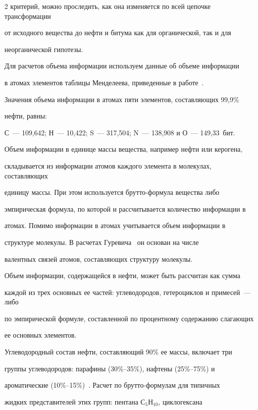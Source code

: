 \begin{multicols}{2}
критерий, можно проследить, как она изменяется по всей цепочке трансформации 

от исходного вещества до нефти и битума как для органической, так и для 

неорганической гипотезы.

     Для расчетов объема информации используем данные об объеме информации 

в атомах элементов таблицы Менделеева, приведенные в работе~\cite{8s}. 

Значения объема информации в атомах пяти элементов, составляющих 99,9\% 

нефти, равны: 

     С~--- 109,642; Н~--- 10,422; S~--- 317,504; N~--- 138,908 и О~--- 149,33~бит.

     

     Объем информации в единице массы вещества, например нефти или керогена, 

складывается из информации атомов каждого элемента в молекулах, составляющих 

единицу массы. При этом используется брутто-формула вещества либо 

эмпирическая формула, по которой и рассчитывается количество информации в 

атомах. Помимо информации в атомах учитывается объем информации в 

структуре молекулы. В расчетах Гуревича~\cite{8s} он основан на числе 

валентных связей атомов, составляющих структуру молекулы. 

     

     Объем информации, содержащейся в нефти, может быть рассчитан как сумма 

каждой из трех основных ее частей: углеводородов, гетероциклов и примесей~--- либо 

по эмпирической формуле, со\-став\-лен\-ной по процентному содержанию слагающих 

ее основных элементов. 

     

     Углеводородный состав нефти, составляющий 90\% ее массы, включает три 

группы углеводородов: парафины (30\%--35\%), нафтены (25\%--75\%) и 

ароматические (10\%--15\%)~\cite{16s}. Расчет по брутто-фор\-му\-лам для типичных 

жидких представителей этих групп: пентана С$_5$Н$_{10}$, циклогексана 


\end{multicols}
